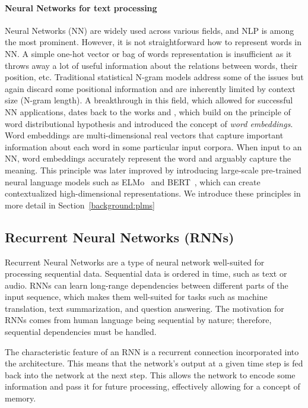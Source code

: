 \paragraph{Neural Networks for text processing}
Neural Networks (NN) are widely used across various fields, and NLP is among the most prominent.
However, it is not straightforward how to represent words in NN.
A simple one-hot vector or bag of words representation is insufficient as it throws away a lot of useful information about the relations between words, their position, etc.
Traditional statistical N-gram models \cite{jurafsky2000speech} address some of the issues but again discard some positional information and are inherently limited by context size (N-gram length).
A breakthrough in this field, which allowed for successful NN applications, dates back to the works \citep{mikolov2010recurrent} and \citep{mikolov2013distributed}, which build on the principle of word distributional hypothesis and introduced the concept of \emph{word embeddings}.
Word embeddings are multi-dimensional real vectors that capture important information about each word in some particular input corpora.
When input to an NN, word embeddings accurately represent the word and arguably capture the meaning.
This principle was later improved by introducing large-scale pre-trained neural language models such as ELMo~\cite{peters-etal-2018-deep} and BERT~\cite{devlin2019}, which can create contextualized high-dimensional representations.
We introduce these principles in more detail in Section~\ref{background:plms}

\subsection{Recurrent Neural Networks (RNNs)}
\label{background:rnns}
Recurrent Neural Networks are a type of neural network well-suited for processing sequential data\cite{GoodBengCour16}. Sequential data is ordered in time, such as text or audio.
RNNs can learn long-range dependencies between different parts of the input sequence, which makes them well-suited for tasks such as machine translation, text summarization, and question answering.
The motivation for RNNs comes from human language being sequential by nature; therefore, sequential dependencies must be handled.

The characteristic feature of an RNN is a recurrent connection incorporated into the architecture.
This means that the network's output at a given time step is fed back into the network at the next step. This allows the network to encode some information and pass it for future processing, effectively allowing for a concept of memory.

